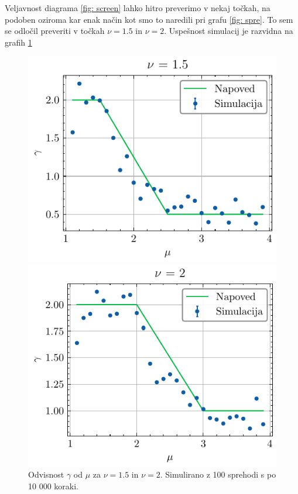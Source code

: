 \documentclass[slovene,11pt,a4paper]{article}
\begin{document}
\newpage
Veljavnost diagrama \ref{fig: screen} lahko hitro preverimo v nekaj točkah, na podoben oziroma kar enak način kot smo to naredili pri grafu \ref{fig: spre}. To sem se odločil preveriti v točkah $\nu = 1.5$ in $\nu=2$. Uspešnost simulacij je razvidna na grafih \ref{fig: nu}

\begin{figure}[ht]
  \centering
  \begin{minipage}{0.48\textwidth}
    \centering
    \includegraphics[width=\linewidth]{graphs/nu=1.5.pdf}
    
  \end{minipage}%
  \hfill%
  \begin{minipage}{0.48\textwidth}
    \centering
    \includegraphics[width=\linewidth]{graphs/nu=2.pdf}
    
  \end{minipage}
  \caption{Odvisnost $\gamma$ od $\mu$ za $\nu=1.5$ in $\nu=2$. Simulirano z 100 sprehodi s po 10 000 koraki.}
  \label{fig: nu}
\end{figure}
\end{document}
